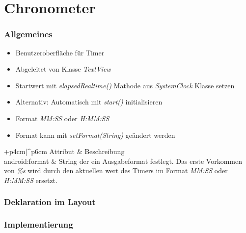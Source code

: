 \section{Chronometer}
\begin{frame}[label=chronometer]
   \frametitle{Allgemeines}
   \begin{itemize}
      \item Benutzeroberfläche für Timer
      \item Abgeleitet von Klasse \emph{TextView}
      \item Startwert mit \emph{elapsedRealtime()} Mathode aus 
         \emph{SystemClock} Klasse setzen
      \item Alternativ: Automatisch mit \emph{start()} initialisieren
      \item Format \emph{MM:SS} oder \emph{H:MM:SS}
      \item Format kann mit \emph{setFormat(String)} geändert werden
   \end{itemize}

   \begin{attrDesc}{+p{4cm}|^p{6cm}}
      Attribut & Beschreibung\\
      \hline
      android:format & String der ein Ausgabeformat festlegt. Das erste Vorkommen 
         von \emph{\%s} wird durch den aktuellen wert des Timers im Format 
         \emph{MM:SS} oder \emph{H:MM:SS} ersetzt.\\
   \end{attrDesc}
\end{frame}

\begin{frame}
   \frametitle{Deklaration im Layout}
   
\end{frame}

\begin{frame}
   \frametitle{Implementierung}
   
\end{frame}

